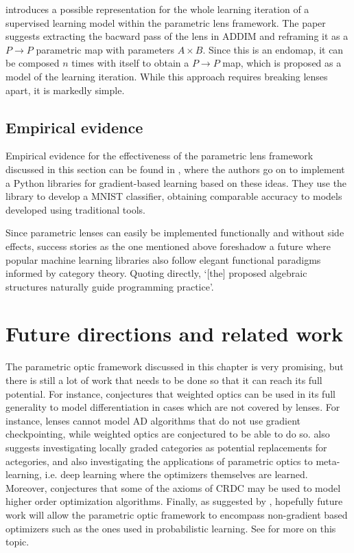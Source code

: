 \documentclass[11pt,a4paper,openright,twoside]{report}
\theoremstyle{plain}
\theoremstyle{definition}
\begin{document}
\cite{cruttwell2022categorical} introduces a possible representation for the whole learning iteration of a supervised learning model within the parametric lens framework. The paper suggests extracting the bacward pass of the lens in ADDIM and reframing it as a $P \to P$ parametric map with parameters $A \times B$. Since this is an endomap, it can be composed $n$ times with itself to obtain a $P \to P$ map, which is proposed as a model of the learning iteration. While this approach requires breaking lenses apart, it is markedly simple.


\subsection{Empirical evidence}

Empirical evidence for the effectiveness of the parametric lens framework discussed in this section can be found in \cite{cruttwell2022categorical}, where the authors go on to implement a Python libraries for gradient-based learning based on these ideas. They use the library to develop a MNIST classifier, obtaining comparable accuracy to models developed using traditional tools.


Since parametric lenses can easily be implemented functionally and without side effects, success stories as the one mentioned above foreshadow a future where popular machine learning libraries also follow elegant functional paradigms informed by category theory. Quoting  \cite{cruttwell2022categorical} directly, \lq[the] proposed algebraic structures naturally guide programming practice\rq.


\section{Future directions and related work}

The parametric optic framework discussed in this chapter is very promising, but there is still a lot of work that needs to be done so that it can reach its full potential. For instance, \cite{gavranovic2024fundamental} conjectures that weighted optics can be used in its full generality to model differentiation in cases which are not covered by lenses. For instance, lenses cannot model AD algorithms that do not use gradient checkpointing, while weighted optics are conjectured to be able to do so. \cite{gavranovic2024fundamental} also suggests investigating locally graded categories as potential replacements for actegories, and also investigating the applications of parametric optics to meta-learning, i.e. deep learning where the optimizers themselves are learned. Moreover, \cite{cruttwell2022categorical} conjectures that some of the axioms of CRDC may be used to model higher order optimization algorithms. Finally, as suggested by \cite{cruttwell2022categorical}, hopefully future work will allow the parametric optic framework to encompass non-gradient based optimizers such as the ones used in probabilistic learning. See \cite{shiebler2021category} for more on this topic.
\end{document}
